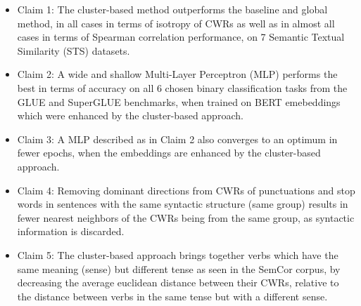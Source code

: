 

\begin{itemize}
    \item Claim 1: The cluster-based method outperforms the baseline and global method, in all cases in terms of isotropy of CWRs as well as in almost all cases in terms of Spearman correlation performance, on 7 Semantic Textual Similarity (STS) datasets.
    \item Claim 2: A wide and shallow Multi-Layer Perceptron (MLP) performs the best in terms of accuracy on all 6 chosen binary classification tasks from the GLUE \cite{glue} and SuperGLUE \cite{superglue} benchmarks, when trained on BERT emebeddings which were enhanced by the cluster-based approach.
    \item Claim 3: A MLP described as in Claim 2 also converges to an optimum in fewer epochs, when the embeddings are enhanced by the cluster-based approach.
    \item Claim 4: Removing dominant directions from CWRs of punctuations and stop words in sentences with the same syntactic structure (same group) results in fewer nearest neighbors of the CWRs being from the same group, as syntactic information is discarded.
    \item Claim 5: The cluster-based approach brings together verbs which have the same meaning (sense) but different tense as seen in the SemCor corpus, by decreasing the average euclidean distance between their CWRs, relative to the distance between verbs in the same tense but with a different sense.

\end{itemize}

